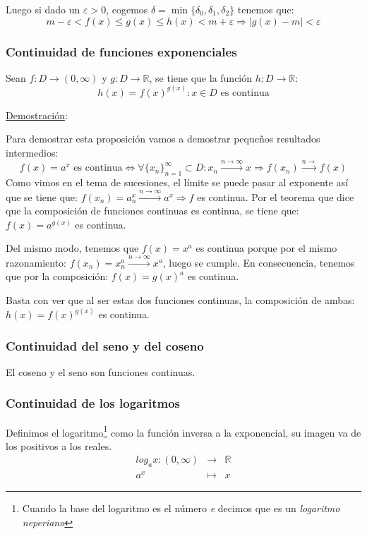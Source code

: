 \documentclass[10pt,a4paper,openright]{book}
\begin{document}
Luego si dado un $\varepsilon>0$, cogemos $\delta=\min\{\delta_0, \delta_1,\delta_2\}$ tenemos que:
$$m-\varepsilon< f(x) \leq g(x) \leq h(x) < m+\varepsilon\Rightarrow |g(x)-m|<\varepsilon$$

\subsubsection*{Continuidad de funciones exponenciales}
Sean $f: D\rightarrow (0,\infty)$ y $g: D\rightarrow \mathbb R$, se tiene que la función $h: D\rightarrow \mathbb R$:
$$h(x)=f(x)^{g(x)}: x\in D \mbox{ es continua}$$

\underline{Demostración}:\par
Para demostrar esta proposición vamos a demostrar pequeños resultados intermedios:
$$f(x)=a^x \mbox{ es continua} \Leftrightarrow \forall\{x_n\}_{n=1}^\infty\subset D: x_n\xrightarrow{n\rightarrow\infty} x\Rightarrow f(x_n)\xrightarrow{n\rightarrow} f(x)$$
Como vimos en el tema de sucesiones, el límite se puede pasar al exponente así que se tiene que: $f(x_n)=a^x_n\xrightarrow{n\rightarrow\infty} a^x\Rightarrow f$ es continua. Por el teorema que dice que la composición de funciones continuas es continua, se tiene que: $f(x)=a^{g(x)}$ es continua.

Del mismo modo, tenemos que $f(x)=x^a$ es continua porque por el mismo razonamiento: $f(x_n)=x_n^a\xrightarrow{n\rightarrow\infty} x^a$, luego se cumple. En consecuencia, tenemos que por la composición: $f(x)=g(x)^a$ es continua.

Basta con ver que al ser estas dos funciones continuas, la composición de ambas: $h(x)=f(x)^{g(x)}$ es continua.

\subsubsection*{Continuidad del seno y del coseno}
El coseno y el seno son funciones continuas.

\subsubsection*{Continuidad de los logaritmos}
Definimos el logaritmo\footnote{Cuando la base del logaritmo es el número \textit{e} decimos que es un \textit{logaritmo neperiano}} como la función inversa a la exponencial, su imagen va de los positivos a los reales.
\begin{eqnarray*} log_a x: (0,\infty) &\longrightarrow& \mathbb R \\ a^x &\longmapsto& x \end{eqnarray*}
\end{document}
